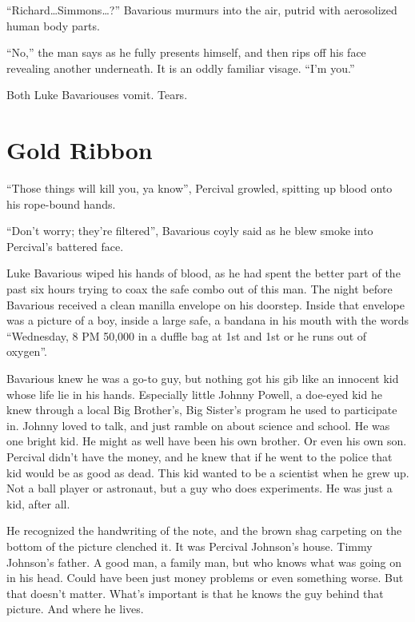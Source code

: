 ``Richard{\ldots}Simmons{\ldots}?'' Bavarious murmurs
into the air, putrid with aerosolized human body parts.



``No,'' the man says as he fully presents himself, and
then rips off his face revealing another underneath. It is an oddly
familiar visage. ``I'm you.''



Both Luke Bavariouses vomit. Tears.


 



\chapter{Gold Ribbon}



``Those things will kill you, ya know'', Percival
growled, spitting up blood onto his rope-bound hands.

``Don't worry; they're filtered'', Bavarious
coyly said as he blew smoke into Percival's battered
face.

Luke Bavarious wiped his hands of blood, as he had spent the better
part of the past six hours trying to coax the safe combo out of
this man. The night before Bavarious received a clean manilla
envelope on his doorstep. Inside that envelope was a picture of a
boy, inside a large safe, a bandana in his mouth with the words
``Wednesday, 8 PM 50,000 in a duffle bag at 1st and 1st or he
runs out of oxygen''.



Bavarious knew he was a go-to guy, but nothing got his gib like an
innocent kid whose life lie in his hands. Especially little Johnny
Powell, a doe-eyed kid he knew through a local Big Brother's,
Big Sister's program he used to participate in. Johnny loved
to talk, and just ramble on about science and school. He was one
bright kid. He might as well have been his own brother. Or even his
own son. Percival didn't have the money, and he knew that if
he went to the police that kid would be as good as dead. This kid
wanted to be a scientist when he grew up. Not a ball player or
astronaut, but a guy who does experiments. He was just a kid, after
all.



He recognized the handwriting of the note, and the brown shag
carpeting on the bottom of the picture clenched it. It was Percival
Johnson's house. Timmy Johnson's father. A good man, a
family man, but who knows what was going on in his head. Could have
been just money problems or even something worse. But that
doesn't matter. What's important is that he knows the
guy behind that picture. And where he lives.



